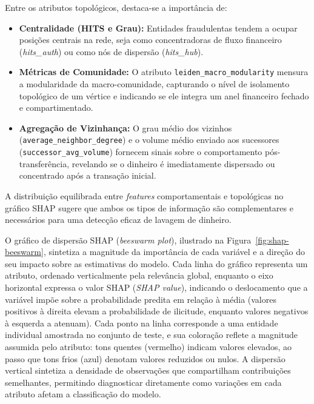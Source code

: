 \documentclass[a4paper,12pt,oneside,onecolumn,final,fleqn]{repUERJ}
\begin{document}
Entre os atributos topológicos, destaca-se a importância de:

\begin{itemize}
    \item \textbf{Centralidade (HITS e Grau):} Entidades fraudulentas tendem a ocupar posições centrais na rede, seja como concentradoras de fluxo financeiro (\textit{hits\_auth}) ou como nós de dispersão (\textit{hits\_hub}).
    
    \item \textbf{Métricas de Comunidade:} O atributo \texttt{leiden\_macro\_modularity} mensura a modularidade da macro-comunidade, capturando o nível de isolamento topológico de um vértice e indicando se ele integra um anel financeiro fechado e compartimentado.
    
    \item \textbf{Agregação de Vizinhança:} O grau médio dos vizinhos (\texttt{average\_neighbor\_degree}) e o volume médio enviado aos sucessores (\texttt{successor\_avg\_volume}) fornecem sinais sobre o comportamento pós-transferência, revelando se o dinheiro é imediatamente dispersado ou concentrado após a transação inicial.
\end{itemize}

A distribuição equilibrada entre \textit{features} comportamentais e topológicas no gráfico SHAP sugere que ambos os tipos de informação são complementares e necessários para uma detecção eficaz de lavagem de dinheiro.

O gráfico de dispersão SHAP (\textit{beeswarm plot}), ilustrado na Figura~\ref{fig:shap-beeswarm}, sintetiza a magnitude da importância de cada variável e a direção do seu impacto sobre as estimativas do modelo. Cada linha do gráfico representa um atributo, ordenado verticalmente pela relevância global, enquanto o eixo horizontal expressa o valor SHAP (\textit{SHAP value}), indicando o deslocamento que a variável impõe sobre a probabilidade predita em relação à média (valores positivos à direita elevam a probabilidade de ilicitude, enquanto valores negativos à esquerda a atenuam). Cada ponto na linha corresponde a uma entidade individual amostrada no conjunto de teste, e sua coloração reflete a magnitude assumida pelo atributo: tons quentes (vermelho) indicam valores elevados, ao passo que tons frios (azul) denotam valores reduzidos ou nulos. A dispersão vertical sintetiza a densidade de observações que compartilham contribuições semelhantes, permitindo diagnosticar diretamente como variações em cada atributo afetam a classificação do modelo.
\end{document}
